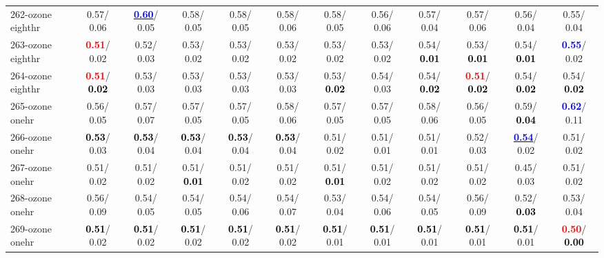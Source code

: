 \begin{table}[h]
\begin{center}
{\begin{tabular}{lc|c|c|c|c|c|c|c|c|c|c}
262-ozone eighthr &   0.57/  0.06 & \underline{\textcolor{blue}{\textbf{  0.60}}}/  0.05 &   0.58/  0.05 &   0.58/  0.05 &   0.58/  0.06 &   0.58/  0.05 &   0.56/  0.06 &   0.57/  0.04 &   0.57/  0.06 &   0.56/  0.04 &   0.55/  0.04 \\
263-ozone eighthr & \textcolor{red}{\textbf{  0.51}}/  0.02 &   0.52/  0.03 &   0.53/  0.02 &   0.53/  0.02 &   0.53/  0.02 &   0.53/  0.02 &   0.53/  0.02 &   0.54/\textcolor{black}{\textbf{  0.01}} &   0.53/\textcolor{black}{\textbf{  0.01}} &   0.54/\textcolor{black}{\textbf{  0.01}} & \textcolor{blue}{\textbf{  0.55}}/  0.02 \\ \hline
264-ozone eighthr & \textcolor{red}{\textbf{  0.51}}/\textcolor{black}{\textbf{  0.02}} &   0.53/  0.03 &   0.53/  0.03 &   0.53/  0.03 &   0.53/  0.03 &   0.53/\textcolor{black}{\textbf{  0.02}} &   0.54/  0.03 &   0.54/\textcolor{black}{\textbf{  0.02}} & \textcolor{red}{\textbf{  0.51}}/\textcolor{black}{\textbf{  0.02}} &   0.54/\textcolor{black}{\textbf{  0.02}} &   0.54/\textcolor{black}{\textbf{  0.02}} \\
265-ozone onehr &   0.56/  0.05 &   0.57/  0.07 &   0.57/  0.05 &   0.57/  0.05 &   0.58/  0.06 &   0.57/  0.05 &   0.57/  0.05 &   0.58/  0.06 &   0.56/  0.05 &   0.59/\textcolor{black}{\textbf{  0.04}} & \textcolor{blue}{\textbf{  0.62}}/  0.11 \\
266-ozone onehr & \textcolor{black}{\textbf{  0.53}}/  0.03 & \textcolor{black}{\textbf{  0.53}}/  0.04 & \textcolor{black}{\textbf{  0.53}}/  0.04 & \textcolor{black}{\textbf{  0.53}}/  0.04 & \textcolor{black}{\textbf{  0.53}}/  0.04 &   0.51/  0.02 &   0.51/  0.01 &   0.51/  0.01 &   0.52/  0.03 & \underline{\textcolor{blue}{\textbf{  0.54}}}/  0.02 &   0.51/  0.02 \\
267-ozone onehr &   0.51/  0.02 &   0.51/  0.02 &   0.51/\textcolor{black}{\textbf{  0.01}} &   0.51/  0.02 &   0.51/  0.02 &   0.51/\textcolor{black}{\textbf{  0.01}} &   0.51/  0.02 &   0.51/  0.02 &   0.51/  0.02 &   0.45/  0.03 &   0.51/  0.02 \\
268-ozone onehr &   0.56/  0.09 &   0.54/  0.05 &   0.54/  0.05 &   0.54/  0.06 &   0.54/  0.07 &   0.53/  0.04 &   0.54/  0.06 &   0.54/  0.05 &   0.56/  0.09 &   0.52/\textcolor{black}{\textbf{  0.03}} &   0.53/  0.04 \\
269-ozone onehr & \textcolor{black}{\textbf{  0.51}}/  0.02 & \textcolor{black}{\textbf{  0.51}}/  0.02 & \textcolor{black}{\textbf{  0.51}}/  0.02 & \textcolor{black}{\textbf{  0.51}}/  0.02 & \textcolor{black}{\textbf{  0.51}}/  0.02 & \textcolor{black}{\textbf{  0.51}}/  0.01 & \textcolor{black}{\textbf{  0.51}}/  0.01 & \textcolor{black}{\textbf{  0.51}}/  0.01 & \textcolor{black}{\textbf{  0.51}}/  0.01 & \textcolor{black}{\textbf{  0.51}}/  0.01 & \textcolor{red}{\textbf{  0.50}}/\textcolor{black}{\textbf{  0.00}} \\

\end{tabular}}
\end{center}
\end{table}
